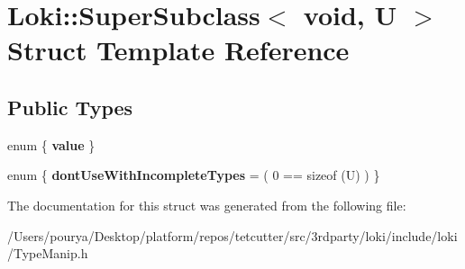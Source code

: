 \hypertarget{structLoki_1_1SuperSubclass_3_01void_00_01U_01_4}{}\section{Loki\+:\+:Super\+Subclass$<$ void, U $>$ Struct Template Reference}
\label{structLoki_1_1SuperSubclass_3_01void_00_01U_01_4}
\subsection*{Public Types}
\begin{DoxyCompactItemize}
\item 
\hypertarget{structLoki_1_1SuperSubclass_3_01void_00_01U_01_4_a17cac2c1d17ce5e72a55e588461f40c7}{}enum \{ {\bfseries value}
 \}\label{structLoki_1_1SuperSubclass_3_01void_00_01U_01_4_a17cac2c1d17ce5e72a55e588461f40c7}

\item 
\hypertarget{structLoki_1_1SuperSubclass_3_01void_00_01U_01_4_ae8c56a84bdbb2b43df14a3530c251136}{}enum \{ {\bfseries dont\+Use\+With\+Incomplete\+Types} = ( 0 == sizeof (U) )
 \}\label{structLoki_1_1SuperSubclass_3_01void_00_01U_01_4_ae8c56a84bdbb2b43df14a3530c251136}

\end{DoxyCompactItemize}


The documentation for this struct was generated from the following file\+:\begin{DoxyCompactItemize}
\item 
/\+Users/pourya/\+Desktop/platform/repos/tetcutter/src/3rdparty/loki/include/loki/Type\+Manip.\+h\end{DoxyCompactItemize}
